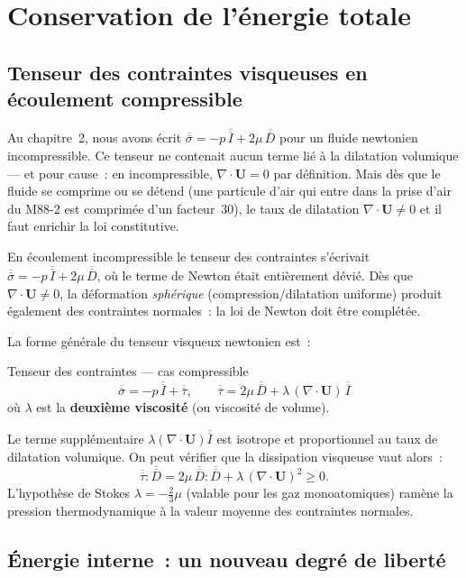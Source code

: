 \documentclass[11pt,a4paper]{report}
\newcommand{\ten}[1]{\overline{\overline{#1}}}   %
\begin{document}
\section{Conservation de l'\'energie totale}

\subsection{Tenseur des contraintes visqueuses en \'ecoulement compressible}

Au chapitre~2, nous avons \'ecrit $\ten{\sigma} = -p\,\ten{I} + 2\mu\,\ten{D}$ pour un fluide newtonien incompressible. Ce tenseur ne contenait aucun terme li\'e \`a la dilatation volumique --- et pour cause~: en incompressible, $\nabla\cdot\bm{U} = 0$ par d\'efinition. Mais d\`es que le fluide se comprime ou se d\'etend (une particule d'air qui entre dans la prise d'air du M88-2 est comprim\'ee d'un facteur~30), le taux de dilatation $\nabla\cdot\bm{U} \neq 0$ et il faut enrichir la loi constitutive.

En \'ecoulement incompressible le tenseur des contraintes s'\'ecrivait
$\ten{\sigma} = -p\,\ten{I} + 2\mu\,\ten{D}$,
o\`u le terme de Newton \'etait enti\`erement d\'evi\'e. D\`es que $\nabla \cdot \bm{U} \neq 0$,
la d\'eformation \emph{sph\'erique} (compression/dilatation uniforme) produit \'egalement
des contraintes normales~: la loi de Newton doit \^etre compl\'et\'ee.

La forme g\'en\'erale du tenseur visqueux newtonien est~:

\begin{importantbox}{Tenseur des contraintes --- cas compressible}
\[
  \ten{\sigma} = -p\,\ten{I} + \ten{\tau},
  \qquad
  \ten{\tau} = 2\mu\,\ten{D} + \lambda\,(\nabla \cdot \bm{U})\,\ten{I}
\]
o\`u $\lambda$ est la \textbf{deuxi\`eme viscosit\'e} (ou viscosit\'e de volume).
\end{importantbox}

Le terme suppl\'ementaire $\lambda(\nabla \cdot \bm{U})\ten{I}$ est isotrope et
proportionnel au taux de dilatation volumique. On peut v\'erifier que la dissipation
visqueuse vaut alors~:
\[
  \ten{\tau} : \ten{D}
  = 2\mu\,\ten{D} : \ten{D} + \lambda\,(\nabla \cdot \bm{U})^2 \geq 0.
\]
L'hypoth\`ese de Stokes $\lambda = -\tfrac{2}{3}\mu$ (valable pour les gaz monoatomiques)
ram\`ene la pression thermodynamique \`a la valeur moyenne des contraintes normales.

\subsection{\'Energie interne~: un nouveau degr\'e de libert\'e}
\end{document}
